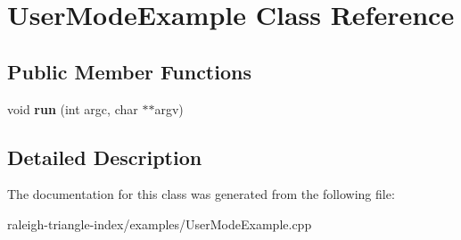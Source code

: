 \section{User\+Mode\+Example Class Reference}
\label{class_user_mode_example}
\subsection*{Public Member Functions}
\begin{DoxyCompactItemize}
\item 
void {\bfseries run} (int argc, char $\ast$$\ast$argv)\label{class_user_mode_example_a1751753176aafee8fa7692e9c0fd0a49}

\end{DoxyCompactItemize}


\subsection{Detailed Description}


The documentation for this class was generated from the following file\+:\begin{DoxyCompactItemize}
\item 
raleigh-\/triangle-\/index/examples/User\+Mode\+Example.\+cpp\end{DoxyCompactItemize}
